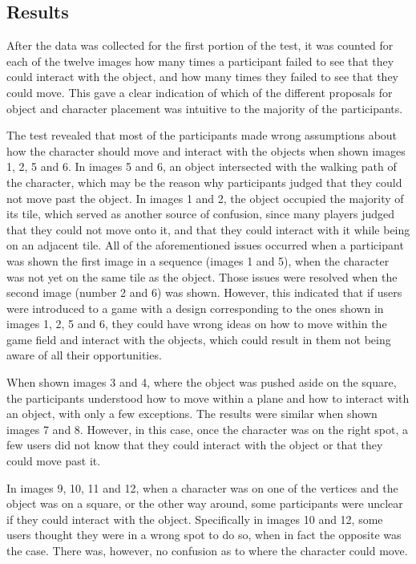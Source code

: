 \subsection{Results}
After the data was collected for the first portion of the test, it was counted for each of the twelve images how many times a participant failed to see that they could interact with the object, and how many times they failed to see that they could move. This gave a clear indication of which of the different proposals for object and character placement was intuitive to the majority of the participants.

The test revealed that most of the participants made wrong assumptions about how the character should move and interact with the objects when shown images 1, 2, 5 and 6. In images 5 and 6, an object intersected with the walking path of the character, which may be the reason why participants judged that they could not move past the object. In images 1 and 2, the object occupied the majority of its tile, which served as another source of confusion, since many players judged that they could not move onto it, and that they could interact with it while being on an adjacent tile. All of the aforementioned issues occurred when a participant was shown the first image in a sequence (images 1 and 5), when the character was not yet on the same tile as the object. Those issues were resolved when the second image (number 2 and 6) was shown. However, this indicated that if users were introduced to a game with a design corresponding to the ones shown in images 1, 2, 5 and 6, they could have wrong ideas on how to move within the game field and interact with the objects, which could result in them not being aware of all their opportunities.

When shown images 3 and 4, where the object was pushed aside on the square, the participants understood how to move within a plane and how to interact with an object, with only a few exceptions. The results were similar when shown images 7 and 8. However, in this case, once the character was on the right spot, a few users did not know that they could interact with the object or that they could move past it. 

In images 9, 10, 11 and 12, when a character was on one of the vertices and the object was on a square, or the other way around, some participants were unclear if they could interact with the object. Specifically in images 10 and 12, some users thought they were in a wrong spot to do so, when in fact the opposite was the case. There was, however, no confusion as to where the character could move.


